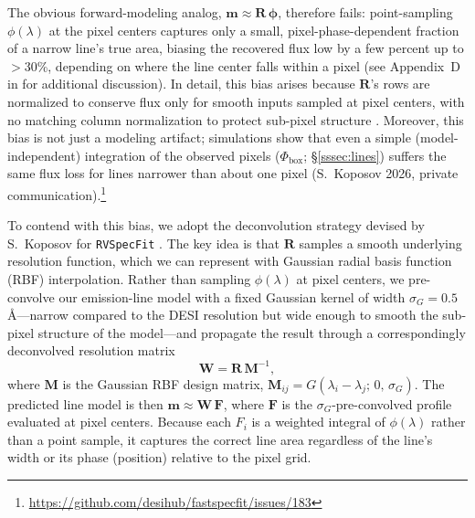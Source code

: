 \documentclass[modern,linenumbers]{aastex702}
\begin{document}
The obvious forward-modeling analog, $\mathbf{m} \approx
\mathbf{R}\,\boldsymbol{\phi}$, therefore fails: point-sampling
$\phi(\lambda)$ at the pixel centers captures only a small,
pixel-phase-dependent fraction of a narrow line's true area, biasing
the recovered flux low by a few percent up to $>$30\%, depending on
where the line center falls within a pixel (see Appendix~D in
\citealt{guy23a} for additional discussion). In detail, this bias
arises because $\mathbf{R}$'s rows are normalized to conserve flux
only for smooth inputs sampled at pixel centers, with no matching
column normalization to protect sub-pixel structure
\citep{guy23a}. Moreover, this bias is not
just a modeling artifact; simulations show that even a simple
(model-independent) integration of the observed pixels
($\Phi_\mathrm{box}$; \S\ref{sssec:lines}) suffers the same
flux loss for lines narrower than about one pixel (S.~Koposov
2026, private
communication).\footnote{\url{https://github.com/desihub/fastspecfit/issues/183}}

To contend with this bias, we adopt the deconvolution strategy devised
by S.~Koposov for \texttt{RVSpecFit} \citep{koposov19b, koposov26a}.
The key idea is that $\mathbf{R}$ samples a smooth underlying
resolution function, which we can represent with Gaussian radial basis
function (RBF) interpolation. Rather than sampling $\phi(\lambda)$ at
pixel centers, we pre-convolve our emission-line model with a fixed
Gaussian kernel of width $\sigma_G = 0.5$\,\AA---narrow compared to
the DESI resolution but wide enough to smooth the sub-pixel structure
of the model---and propagate the result through a correspondingly
deconvolved resolution matrix
\begin{equation}
  \mathbf{W} = \mathbf{R}\,\mathbf{M}^{-1},
  \label{eq:wmatrix}
\end{equation}
where $\mathbf{M}$ is the Gaussian RBF design matrix, $\mathbf{M}_{ij} =
G(\lambda_i - \lambda_j;\,0,\,\sigma_G)$. The predicted line model is
then $\mathbf{m} \approx \mathbf{W}\,\mathbf{F}$, where $\mathbf{F}$
is the $\sigma_G$-pre-convolved profile evaluated at pixel
centers. Because each $F_i$ is a weighted integral of $\phi(\lambda)$
rather than a point sample, it captures the correct line area
regardless of the line's width or its phase (position) relative to the
pixel grid.
\end{document}
